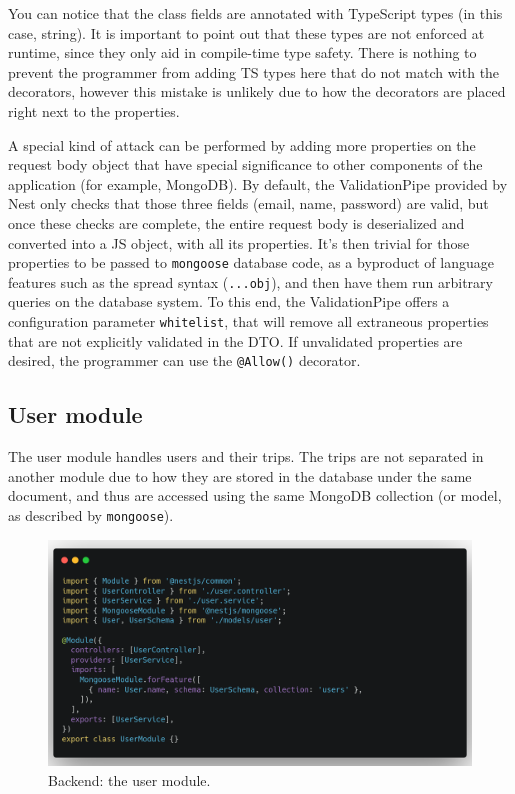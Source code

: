 You can notice that the class fields are annotated with TypeScript types (in this case, string). It is important to point out that these types are not enforced at runtime, since they only aid in compile-time type safety. There is nothing to prevent the programmer from adding TS types here that do not match with the decorators, however this mistake is unlikely due to how the decorators are placed right next to the properties.

A special kind of attack can be performed by adding more properties on the request body object that have special significance to other components of the application (for example, MongoDB). By default, the ValidationPipe provided by Nest only checks that those three fields (email, name, password) are valid, but once these checks are complete, the entire request body is deserialized and converted into a JS object, with all its properties. It's then trivial for those properties to be passed to \verb|mongoose| database code, as a byproduct of language features such as the spread syntax (\verb|...obj|), and then have them run arbitrary queries on the database system. To this end, the ValidationPipe offers a configuration parameter \verb|whitelist|, that will remove all extraneous properties that are not explicitly validated in the DTO. If unvalidated properties are desired, the programmer can use the \verb|@Allow()| decorator.

\subsection{User module}
The user module handles users and their trips. The trips are not separated in another module due to how they are stored in the database under the same document, and thus are accessed using the same MongoDB collection (or model, as described by \verb|mongoose|).

\begin{figure}[htbp]
    \centering
    \includegraphics[width=1\textwidth]{./figures/code/be_user-module.png}
    \caption{Backend: the user module.}
    \label{FigBeUserModule}
\end{figure}

